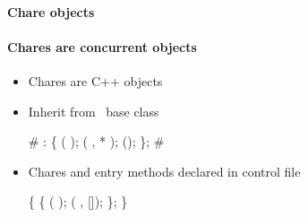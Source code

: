 \begin{frame}[fragile] 
\secframetitle{\ssCharm}
\framesubtitle{Chare objects}
\framesubtitle{Chares are concurrent objects}
\begin{itemize}
\item Chares are C++ objects
\item Inherit from \charm\ base class
\footnotesize
\begin{semiverbatim}
# 
  :   \{
    ( );
     ( ,  * );
     ();
\};
# 
\end{semiverbatim}
\normalsize
\item Chares and entry methods declared in  control file
\footnotesize
\begin{semiverbatim}
 \{
     \{
        ( );
        ( ,  []);
   \};
\}
\end{semiverbatim}
\end{itemize}
\end{frame}
